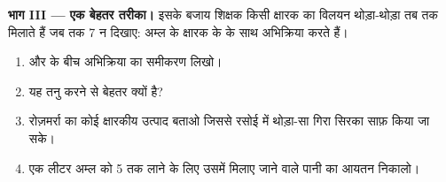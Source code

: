 \begin{problem}
\medskip
\noindent\textbf{भाग III --- एक बेहतर तरीका।}
इसके बजाय शिक्षक किसी क्षारक का विलयन थोड़ा-थोड़ा तब तक मिलाते हैं जब तक
 7 न दिखाए: अम्ल के   क्षारक के 
 के साथ अभिक्रिया करते हैं।
\begin{enumerate}[resume]
  \item {} और   के बीच अभिक्रिया का समीकरण
        लिखो।
  \item यह तनु करने से बेहतर क्यों है?
  \item रोज़मर्रा का कोई क्षारकीय उत्पाद बताओ जिससे रसोई में थोड़ा-सा गिरा सिरका
        साफ़ किया जा सके।
  \item एक लीटर अम्ल को  5 तक लाने के लिए उसमें मिलाए जाने वाले पानी का
        आयतन निकालो।
\end{enumerate}
\end{problem}
